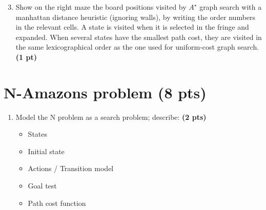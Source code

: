 \documentclass[11pt,a4paper]{report}
\begin{document}
\begin{enumerate}
\setcounter{enumi}{2}
\item Show on the right maze the board positions visited by $A^{\star}$ graph search with a manhattan distance heuristic (ignoring walls), by writing the order numbers in the relevant cells. A state is visited when it is selected in the fringe and expanded. When several states have the smallest path cost, they are visited in the same lexicographical order as the one used for uniform-cost graph search. \textbf{(1 pt)}
\end{enumerate}

\begin{answers}[5.2cm]
\begin{center}
\end{center}
\end{answers}




\section{N-Amazons problem (8 pts)} %

\begin{enumerate}
  \item Model the N problem as a search problem; describe: \textbf{(2 pts)}
		\begin{itemize}
			\item States
			\item Initial state
			\item Actions / Transition model
			\item Goal test
			\item Path cost function
		\end{itemize}
\end{enumerate}
\end{document}
